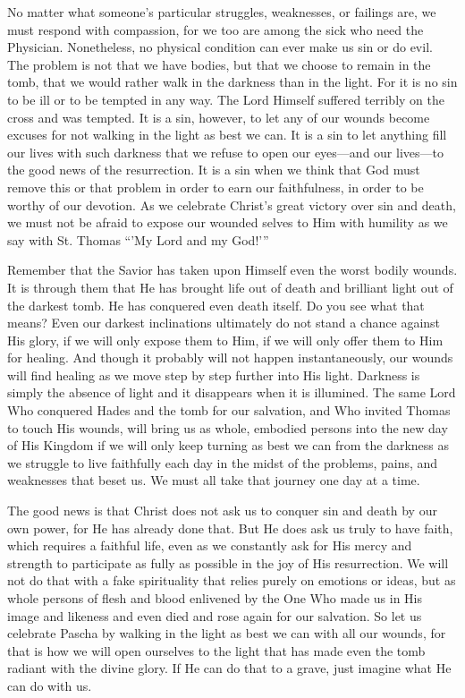 \documentclass[twoside, letterpaper, 12pt]{report}
\begin{document}
\begin{maybetwocolumns}
No matter what someone’s particular struggles, weaknesses, or failings are, we must respond with
compassion, for we too are among the sick who need the Physician. Nonetheless, no physical
condition can ever make us sin or do evil. The problem is not that we have bodies, but that we
choose to remain in the tomb, that we would rather walk in the darkness than in the light. For it is
no sin to be ill or to be tempted in any way. The Lord Himself suffered terribly on the cross and
was tempted. It is a sin, however, to let any of our wounds become excuses for not walking in the
light as best we can. It is a sin to let anything fill our lives with such darkness that we refuse to
open our eyes—and our lives—to the good news of the resurrection. It is a sin when we think that
God must remove this or that problem in order to earn our faithfulness, in order to be worthy of
our devotion. As we celebrate Christ’s great victory over sin and death, we must not be afraid to
expose our wounded selves to Him with humility as we say with St. Thomas “’My Lord and my
God!’”

Remember that the Savior has taken upon Himself even the worst bodily wounds. It is through
them that He has brought life out of death and brilliant light out of the darkest tomb. He has
conquered even death itself. Do you see what that means? Even our darkest inclinations ultimately
do not stand a chance against His glory, if we will only expose them to Him, if we will only offer
them to Him for healing. And though it probably will not happen instantaneously, our wounds
will find healing as we move step by step further into His light. Darkness is simply the absence
of light and it disappears when it is illumined. The same Lord Who conquered Hades and the tomb
for our salvation, and Who invited Thomas to touch His wounds, will bring us as whole, embodied
persons into the new day of His Kingdom if we will only keep turning as best we can from the
darkness as we struggle to live faithfully each day in the midst of the problems, pains, and
weaknesses that beset us. We must all take that journey one day at a time.

The good news is that Christ does not ask us to conquer sin and death by our own power, for He
has already done that. But He does ask us truly to have faith, which requires a faithful life, even
as we constantly ask for His mercy and strength to participate as fully as possible in the joy of His
resurrection. We will not do that with a fake spirituality that relies purely on emotions or ideas,
but as whole persons of flesh and blood enlivened by the One Who made us in His image and
likeness and even died and rose again for our salvation. So let us celebrate Pascha by walking in
the light as best we can with all our wounds, for that is how we will open ourselves to the light
that has made even the tomb radiant with the divine glory. If He can do that to a grave, just imagine
what He can do with us.
\end{maybetwocolumns}
\end{document}
